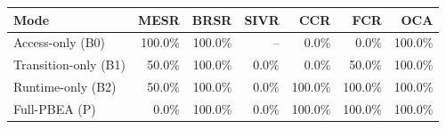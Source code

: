 \begin{tabular}{lrrrrrr}
\toprule
Mode & MESR & BRSR & SIVR & CCR & FCR & OCA \\
\midrule
Access-only (B0) & 100.0\% & 100.0\% & -- & 0.0\% & 0.0\% & 100.0\% \\
Transition-only (B1) & 50.0\% & 100.0\% & 0.0\% & 0.0\% & 50.0\% & 100.0\% \\
Runtime-only (B2) & 50.0\% & 100.0\% & 0.0\% & 100.0\% & 100.0\% & 100.0\% \\
Full-PBEA (P) & 0.0\% & 100.0\% & 0.0\% & 100.0\% & 100.0\% & 100.0\% \\
\bottomrule
\end{tabular}
